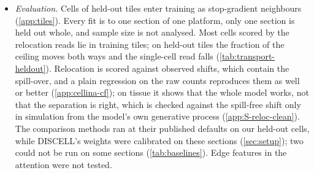 \begin{itemize}[leftmargin=*,itemsep=2pt]
\item \emph{Evaluation.} Cells of held-out tiles enter training as stop-gradient neighbours (\cref{app:tiles}). Every fit is to one section of one platform, only one section is held out whole, and sample size is not analysed. Most cells scored by the relocation reads lie in training tiles; on held-out tiles the fraction of the ceiling moves both ways and the single-cell read falls (\cref{tab:transport-heldout}). Relocation is scored against observed shifts, which contain the spill-over, and a plain regression on the raw counts reproduces them as well or better (\cref{app:cellina-cf}); on tissue it shows that the whole model works, not that the separation is right, which is checked against the spill-free shift only in simulation from the model's own generative process (\cref{app:S-reloc-clean}). The comparison methods ran at their published defaults on our held-out cells, while DISCELL's weights were calibrated on these sections (\cref{sec:setup}); two could not be run on some sections (\cref{tab:baselines}). Edge features in the attention were not tested.
\end{itemize}
